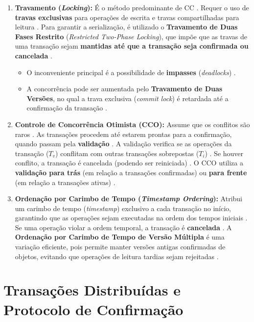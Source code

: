 \documentclass[12pt, a4paper]{article}
\begin{document}
\begin{enumerate}
    \item \textbf{Travamento (\textit{Locking}):} É o método predominante de CC \cite{602, 615}. Requer o uso de \textbf{travas exclusivas} para operações de escrita e travas compartilhadas para leitura \cite{434}. Para garantir a serialização, é utilizado o \textbf{Travamento de Duas Fases Restrito} (\textit{Restricted Two-Phase Locking}), que impõe que as travas de uma transação sejam \textbf{mantidas até que a transação seja confirmada ou cancelada} \cite{616, 437}.
        \begin{itemize}
            \item O inconveniente principal é a possibilidade de \textbf{impasses} (\textit{deadlocks}) \cite{430, 615}.
            \item A concorrência pode ser aumentada pelo \textbf{Travamento de Duas Versões}, no qual a trava exclusiva (\textit{commit lock}) é retardada até a confirmação da transação \cite{397, 399}.
        \end{itemize}
    \item \textbf{Controle de Concorrência Otimista (CCO):} Assume que os conflitos são raros \cite{458, 609, 615}. As transações procedem até estarem prontas para a confirmação, quando passam pela \textbf{validação} \cite{615, 617}. A validação verifica se as operações da transação (\(T_v\)) conflitam com outras transações sobrepostas (\(T_i\)) \cite{617, 400}. Se houver conflito, a transação é cancelada (podendo ser reiniciada) \cite{609, 444}. O CCO utiliza a \textbf{validação para trás} (em relação a transações confirmadas) ou \textbf{para frente} (em relação a transações ativas) \cite{401}.
    \item \textbf{Ordenação por Carimbo de Tempo (\textit{Timestamp Ordering}):} Atribui um carimbo de tempo (\textit{timestamp}) exclusivo a cada transação no início, garantindo que as operações sejam executadas na ordem dos tempos iniciais \cite{610, 615}. Se uma operação violar a ordem temporal, a transação é \textbf{cancelada} \cite{447, 451, 456, 459}. A \textbf{Ordenação por Carimbo de Tempo de Versão Múltipla} é uma variação eficiente, pois permite manter versões antigas confirmadas de objetos, evitando que operações de leitura tardias sejam rejeitadas \cite{405, 406}.
\end{enumerate}

\section{Transações Distribuídas e Protocolo de Confirmação}
\end{document}
